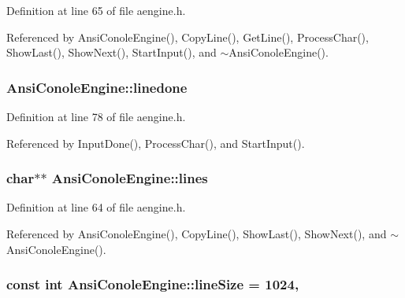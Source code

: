 Definition at line 65 of file aengine.\+h.



Referenced by Ansi\+Conole\+Engine(), Copy\+Line(), Get\+Line(), Process\+Char(), Show\+Last(), Show\+Next(), Start\+Input(), and $\sim$\+Ansi\+Conole\+Engine().

\subsubsection[{\texorpdfstring{linedone}{linedone}}]{ Ansi\+Conole\+Engine\+::linedone\hspace{0.3cm}{\ttfamily [private]}}\hypertarget{classAnsiConoleEngine_a0931686f3224f07bd3a3fe25c06e32c6}{}\label{classAnsiConoleEngine_a0931686f3224f07bd3a3fe25c06e32c6}


Definition at line 78 of file aengine.\+h.



Referenced by Input\+Done(), Process\+Char(), and Start\+Input().

\subsubsection[{\texorpdfstring{lines}{lines}}]{\setlength{\rightskip}{0pt plus 5cm}char$\ast$$\ast$ Ansi\+Conole\+Engine\+::lines\hspace{0.3cm}{\ttfamily [private]}}\hypertarget{classAnsiConoleEngine_a624ec5321c326a68de340f9b77e84c2c}{}\label{classAnsiConoleEngine_a624ec5321c326a68de340f9b77e84c2c}


Definition at line 64 of file aengine.\+h.



Referenced by Ansi\+Conole\+Engine(), Copy\+Line(), Show\+Last(), Show\+Next(), and $\sim$\+Ansi\+Conole\+Engine().

\subsubsection[{\texorpdfstring{line\+Size}{lineSize}}]{\setlength{\rightskip}{0pt plus 5cm}const int Ansi\+Conole\+Engine\+::line\+Size = 1024\hspace{0.3cm}{\ttfamily [static]}, {\ttfamily [private]}}\hypertarget{classAnsiConoleEngine_a59042210f69050bdfb531841e8ac0927}{}\label{classAnsiConoleEngine_a59042210f69050bdfb531841e8ac0927}


